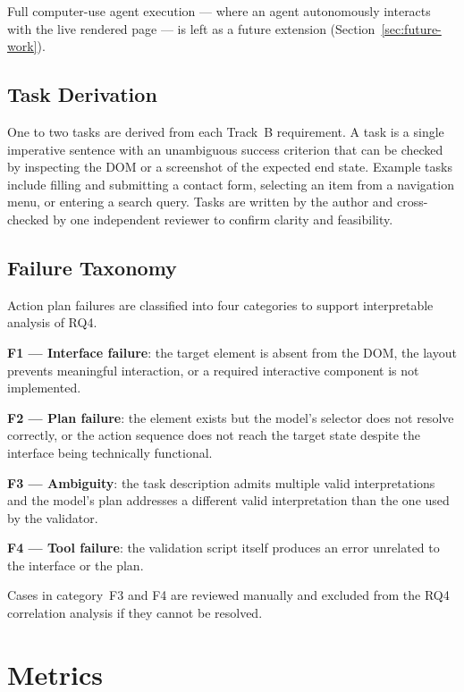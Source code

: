 Full computer-use agent execution — where an agent autonomously
interacts with the live rendered page — is left as a future extension
(Section~\ref{sec:future-work}).

\subsection{Task Derivation}

One to two tasks are derived from each Track~B requirement.
A task is a single imperative sentence with an unambiguous success
criterion that can be checked by inspecting the DOM or a screenshot
of the expected end state.
Example tasks include filling and submitting a contact form, selecting
an item from a navigation menu, or entering a search query.
Tasks are written by the author and cross-checked by one independent
reviewer to confirm clarity and feasibility.

\subsection{Failure Taxonomy}

Action plan failures are classified into four categories to support
interpretable analysis of RQ4.

\textbf{F1 — Interface failure}: the target element is absent from
the DOM, the layout prevents meaningful interaction, or a required
interactive component is not implemented.

\textbf{F2 — Plan failure}: the element exists but the model's selector
does not resolve correctly, or the action sequence does not reach the
target state despite the interface being technically functional.

\textbf{F3 — Ambiguity}: the task description admits multiple valid
interpretations and the model's plan addresses a different valid
interpretation than the one used by the validator.

\textbf{F4 — Tool failure}: the validation script itself produces
an error unrelated to the interface or the plan.

Cases in category~F3 and F4 are reviewed manually and excluded from
the RQ4 correlation analysis if they cannot be resolved.

\section{Metrics}
\label{sec:metrics}

